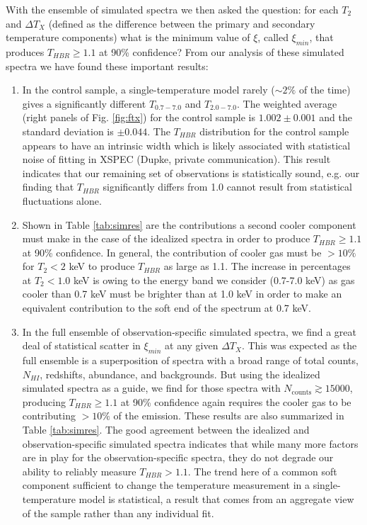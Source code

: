 \documentclass[12pt,preprint]{aastex}
\begin{document}
With the ensemble of simulated spectra we then asked the question:
for each $T_2$ and $\Delta T_X$ (defined as the difference between
the primary and secondary temperature components) what is the minimum
value of $\xi$, called $\xi_{min}$, that produces $T_{HBR} \geq 1.1$ at
90\% confidence? From our analysis of these simulated spectra we have
found these important results:
\begin{enumerate}

\item In the control sample, a single-temperature model rarely
($\sim 2\%$ of the time) gives a significantly different $T_{0.7-7.0}$ and
$T_{2.0-7.0}$. The weighted average (right panels of
Fig. \ref{fig:ftx}) for the control sample is $1.002 \pm 0.001$ and the
standard deviation is $\pm0.044$. The $T_{HBR}$ distribution for the
control sample appears to have an intrinsic width which is likely
associated with statistical noise of fitting in {\textsc{XSPEC}}
(Dupke, private communication). This result indicates that our
remaining set of observations is statistically sound, e.g. our finding
that $T_{HBR}$ significantly differs from 1.0 cannot result from
statistical fluctuations alone.

\item Shown in Table \ref{tab:simres} are the contributions
a second cooler component must make in the case of the idealized
spectra in order to produce $T_{HBR} \geq 1.1$ at 90\% confidence. In
general, the contribution of cooler gas must be $> 10\%$ for $T_2 < 2$
keV to produce $T_{HBR}$ as large as 1.1. The increase in percentages
at $T_2 < 1.0$ keV is owing to the energy band we consider (0.7-7.0
keV) as gas cooler than 0.7 keV must be brighter than at 1.0 keV in
order to make an equivalent contribution to the soft end of the
spectrum at 0.7 keV.

\item In the full ensemble of observation-specific simulated spectra,
we find a great deal of statistical scatter in $\xi_{min}$ at any given
$\Delta T_X$. This was expected as the full ensemble is a
superposition of spectra with a broad range of total counts, $N_{HI}$,
redshifts, abundance, and backgrounds. But using the idealized
simulated spectra as a guide, we find for those spectra with
$N_{\mathrm{counts}} \gtrsim 15000$, producing $T_{HBR} \geq 1.1$ at
90\% confidence again requires the cooler gas to be contributing $>
10\%$ of the emission. These results are also summarized in Table
\ref{tab:simres}. The good agreement between the idealized and
observation-specific simulated spectra indicates that while many more
factors are in play for the observation-specific spectra, they do not
degrade our ability to reliably measure $T_{HBR} > 1.1$.
The trend here of a common soft component sufficient to change the
temperature measurement in a single-temperature model is statistical,
a result that comes from an aggregate view of the sample rather than
any individual fit.


\end{enumerate}
\end{document}
